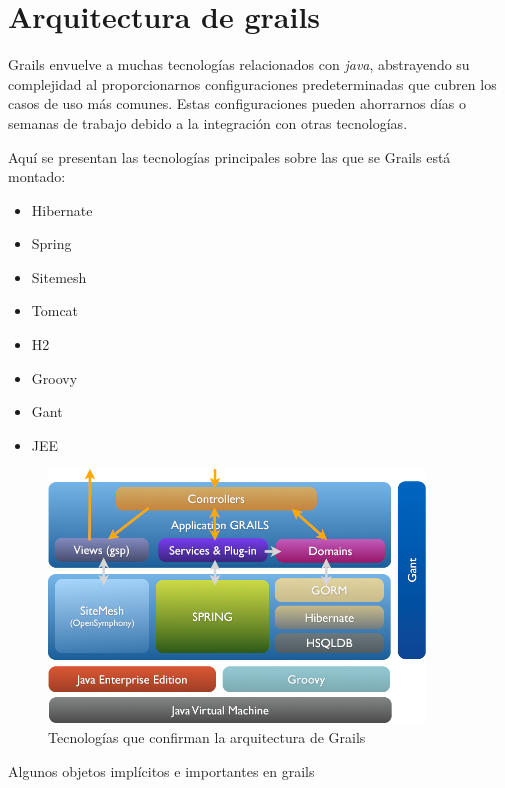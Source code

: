 \chapter{Arquitectura de grails}
Grails envuelve a muchas tecnolog\'ias relacionados con \textit{java}, abstrayendo su complejidad al proporcionarnos configuraciones predeterminadas que cubren los casos de uso m\'as comunes. Estas configuraciones pueden ahorrarnos d\'ias o semanas de trabajo debido a la integraci\'on con otras tecnolog\'ias.

Aqu\'i se presentan las tecnolog\'ias principales sobre las que se Grails est\'a montado:

\begin{multicols}{2}
\begin{itemize}
  \item Hibernate
  \item Spring
  \item Sitemesh
  \item Tomcat
  \item H2
  \item Groovy
  \item Gant
  \item JEE
\end{itemize}
\end{multicols}

\begin{figure}[ht!]

    \includegraphics[width=100mm]{img/arch}
    \caption{Tecnolog\'ias que confirman la arquitectura de Grails}
    \label{arquitectura}

\end{figure}

Algunos objetos impl\'icitos e importantes en grails
